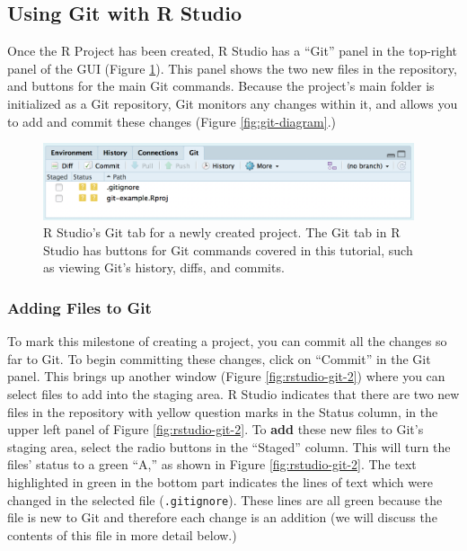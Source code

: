 \documentclass[
  american,
  ,doc,floatsintext]{apa6}
\begin{document}
\hypertarget{using-git-with-r-studio}{%
\subsection{Using Git with R Studio}\label{using-git-with-r-studio}}

Once the R Project has been created, R Studio has a ``Git'' panel in the top-right panel of the GUI (Figure \ref{fig:rstudio-git-1}). This panel shows the two new files in the repository, and buttons for the main Git commands. Because the project's main folder is initialized as a Git repository, Git monitors any changes within it, and allows you to add and commit these changes (Figure \ref{fig:git-diagram}.)

\begin{figure}

{\centering \includegraphics[width=4.3in]{images/rstudio-git-1} 

}

\caption{R Studio's Git tab for a newly created project. The Git tab in R Studio has buttons for Git commands covered in this tutorial, such as viewing Git's history, diffs, and commits.}\label{fig:rstudio-git-1}
\end{figure}

\hypertarget{adding-files-to-git}{%
\subsubsection{Adding Files to Git}\label{adding-files-to-git}}

To mark this milestone of creating a project, you can commit all the changes so far to Git. To begin committing these changes, click on ``Commit'' in the Git panel. This brings up another window (Figure \ref{fig:rstudio-git-2}) where you can select files to add into the staging area. R Studio indicates that there are two new files in the repository with yellow question marks in the Status column, in the upper left panel of Figure \ref{fig:rstudio-git-2}. To \textbf{add} these new files to Git's staging area, select the radio buttons in the ``Staged'' column. This will turn the files' status to a green ``A,'' as shown in Figure \ref{fig:rstudio-git-2}. The text highlighted in green in the bottom part indicates the lines of text which were changed in the selected file (\texttt{.gitignore}). These lines are all green because the file is new to Git and therefore each change is an addition (we will discuss the contents of this file in more detail below.)
\end{document}
